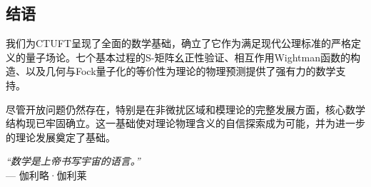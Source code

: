 \subsection{结语}

我们为CTUFT呈现了全面的数学基础，确立了它作为满足现代公理标准的严格定义的量子场论。七个基本过程的S-矩阵幺正性验证、相互作用Wightman函数的构造、以及几何与Fock量子化的等价性为理论的物理预测提供了强有力的数学支持。

尽管开放问题仍然存在，特别是在非微扰区域和模理论的完整发展方面，核心数学结构现已牢固确立。这一基础使对理论物理含义的自信探索成为可能，并为进一步的理论发展奠定了基础。

\vspace{1cm}

\begin{center}
\textit{``数学是上帝书写宇宙的语言。''}\\
--- 伽利略·伽利莱
\end{center}
